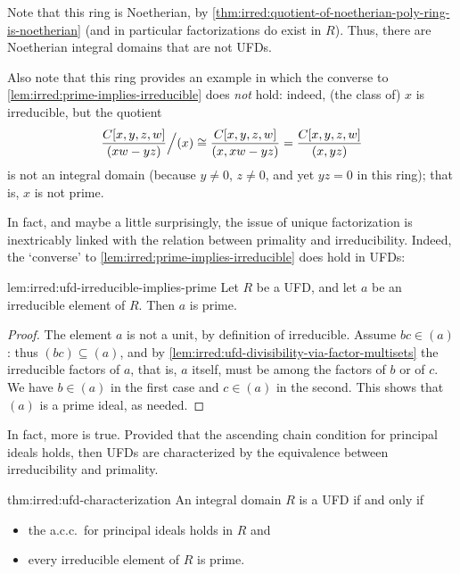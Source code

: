 Note that this ring is Noetherian, by \cref{thm:irred:quotient-of-noetherian-poly-ring-is-noetherian} (and in
particular factorizations do exist in $R$). Thus, there are Noetherian
integral domains that are not UFDs.

Also note that this ring provides an example in which the converse to
\cref{lem:irred:prime-implies-irreducible} does \emph{not} hold: indeed, (the class of) $x$
is irreducible, but the quotient
\[\frac{C[x,y,z,w]}{(xw-yz)} \Big/ (x) \cong
  \frac{C[x,y,z,w]}{(x, xw-yz)} = \frac{C[x,y,z,w]} {(x,yz)}\] is
not an integral domain (because $y \neq 0$, $z \neq 0$, and yet
$yz = 0$ in this ring); that is, $x$ is not prime.

In fact, and maybe a little surprisingly, the issue of unique
factorization is inextricably linked with the relation between
primality and irreducibility. Indeed, the `converse' to
\cref{lem:irred:prime-implies-irreducible} does hold in UFDs:
\begin{lem}{}{lem:irred:ufd-irreducible-implies-prime}
  Let $R$ be a UFD, and let $a$ be an irreducible element of $R$. Then
  $a$ is prime.
\end{lem}

\begin{proof}
  The element $a$ is not a unit, by definition of irreducible. Assume
  $bc \in (a)$: thus $(bc) \subseteq (a)$, and by \cref{lem:irred:ufd-divisibility-via-factor-multisets}
  the irreducible factors of $a$, that is, $a$ itself, must be among
  the factors of $b$ or of $c$. We have $b \in (a)$ in the first case
  and $c \in (a)$ in the second. This shows that $(a)$ is a prime
  ideal, as needed.
\end{proof}

In fact, more is true. Provided that the ascending chain condition for
principal ideals holds, then UFDs are characterized by the equivalence
between irreducibility and primality.
\begin{thm}{}{thm:irred:ufd-characterization}
  An integral domain $R$ is a UFD if and only if
  \begin{itemize}
  \item the a.c.c.\ for principal ideals holds in $R$ and
  \item every irreducible element of $R$ is prime.
  \end{itemize}
\end{thm}

